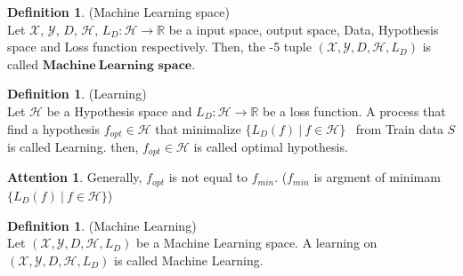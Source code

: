 \documentclass[11pt, a4paper, english, dvipdfmx]{jsarticle}
\theoremstyle{definition}
\newtheorem{Definition+}[Axiom+]{Definition}
\newtheorem{Attention+}[Axiom+]{Attention}
\newcommand{\R}{\mathbb{R}}
\newcommand{\X}{\mathcal{X}}
\newcommand{\Y}{\mathcal{Y}}
\newcommand{\Hil}{\mathcal{H}}
\newcommand{\MLsp}{(\X, \Y, D, \Hil, L_{D})}
\begin{document}
\begin{Definition+}(Machine Learning space)\\
    Let $\X$, $\Y$, $D$, $\Hil$, $L_{D}:\Hil\to\R$ be a input space, output space, Data, Hypothesis space and Loss function respectively.
    Then, the -5 tuple $\MLsp$ is called $\mathbf{Machine~Learning}$ $\mathbf{space}$.
\end{Definition+}
\begin{Definition+}(Learning)\\
   Let $\Hil$ be a Hypothesis space and $L_{D}:\Hil\to\R$ be a loss function. A process that find a hypothesis $f_{opt}\in\Hil$ that minimalize $\{L_{D}(f)~|~f\in\Hil\}$ ~from Train data $S$ is called Learning.
   then, $f_{opt}\in\Hil$ is called optimal hypothesis.
\end{Definition+}

\begin{Attention+}
    Generally, $f_{opt}$ is not equal to $f_{min}$. ($f_{min}$ is argment of minimam $\{L_{D}(f)~|~f\in\Hil\}$)
\end{Attention+}

\begin{Definition+}(Machine Learning)\\
    Let $\MLsp$ be a Machine Learning space. A learning on $\MLsp$ is called Machine Learning.
\end{Definition+}
  
\end{document}
